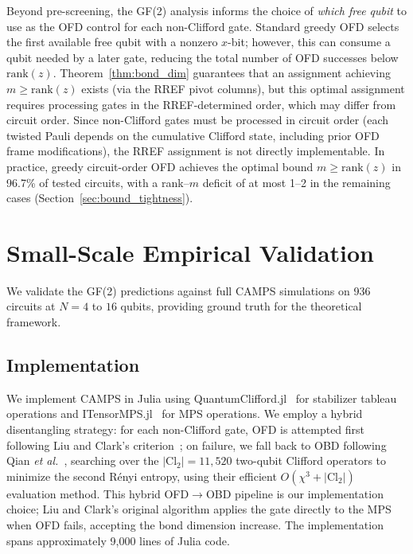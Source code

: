 \documentclass[a4paper,twocolumn,11pt]{quantumarticle}
\begin{document}
Beyond pre-screening, the GF(2) analysis informs the choice of \emph{which free qubit} to use as the OFD control for each non-Clifford gate.
Standard greedy OFD selects the first available free qubit with a nonzero $x$-bit; however, this can consume a qubit needed by a later gate, reducing the total number of OFD successes below $\mathrm{rank}(z)$.
Theorem~\ref{thm:bond_dim} guarantees that an assignment achieving $m \ge \mathrm{rank}(z)$ exists (via the RREF pivot columns), but this optimal assignment requires processing gates in the RREF-determined order, which may differ from circuit order.
Since non-Clifford gates must be processed in circuit order (each twisted Pauli depends on the cumulative Clifford state, including prior OFD frame modifications), the RREF assignment is not directly implementable.
In practice, greedy circuit-order OFD achieves the optimal bound $m \ge \mathrm{rank}(z)$ in 96.7\% of tested circuits, with a rank--$m$ deficit of at most 1--2 in the remaining cases (Section~\ref{sec:bound_tightness}).

\section{Small-Scale Empirical Validation}
\label{sec:validation}

We validate the GF(2) predictions against full CAMPS simulations on 936 circuits at $N = 4$ to $16$ qubits, providing ground truth for the theoretical framework.

\subsection{Implementation}

We implement CAMPS in Julia using QuantumClifford.jl~\cite{Krastanov2022} for stabilizer tableau operations and ITensorMPS.jl~\cite{Fishman2022} for MPS operations.
We employ a hybrid disentangling strategy: for each non-Clifford gate, OFD is attempted first following Liu and Clark's criterion~\cite{Liu2024}; on failure, we fall back to OBD following Qian \emph{et al.}~\cite{Qian2024}, searching over the $|\mathrm{Cl}_2| = 11{,}520$ two-qubit Clifford operators to minimize the second R\'enyi entropy, using their efficient $O(\chi^3 + |\mathrm{Cl}_2|)$ evaluation method.
This hybrid OFD$\to$OBD pipeline is our implementation choice; Liu and Clark's original algorithm applies the gate directly to the MPS when OFD fails, accepting the bond dimension increase.
The implementation spans approximately 9{,}000 lines of Julia code.
\end{document}
